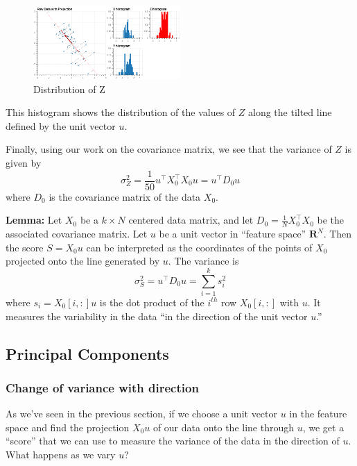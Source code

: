 \documentclass[
]{article}
\begin{document}
\begin{figure}
\hypertarget{fig:pcasimfig-3}{%
\centering
\includegraphics[width=0.5\textwidth,height=\textheight]{../img/PCAsimulated-4.png}
\caption{Distribution of Z}\label{fig:pcasimfig-3}
}
\end{figure}

This histogram shows the distribution of the values of \(Z\) along the
tilted line defined by the unit vector \(u\).

Finally, using our work on the covariance matrix, we see that the
variance of \(Z\) is given by \[
\sigma_{Z}^2 = \frac{1}{50}u^{\intercal}X_{0}^{\intercal}X_{0}u = u^{\intercal}D_{0}u
\] where \(D_{0}\) is the covariance matrix of the data \(X_{0}\).

\textbf{Lemma:} Let \(X_{0}\) be a \(k\times N\) centered data matrix,
and let \(D_{0}=\frac{1}{N}X_{0}^{\intercal}X_{0}\) be the associated
covariance matrix. Let \(u\) be a unit vector in ``feature space''
\(\mathbf{R}^{N}\). Then the score \(S=X_{0}u\) can be interpreted as
the coordinates of the points of \(X_{0}\) projected onto the line
generated by \(u\). The variance is \[
\sigma^{2}_{S} = u^{\intercal}D_{0}u = \sum_{i=1}^{k} s_{i}^2
\] where \(s_{i} = X_{0}[i,:]u\) is the dot product of the \(i^{th}\)
row \(X_{0}[i,:]\) with \(u\). It measures the variability in the data
``in the direction of the unit vector \(u\).''

\hypertarget{principal-components}{%
\subsection{Principal Components}\label{principal-components}}

\hypertarget{change-of-variance-with-direction}{%
\subsubsection{Change of variance with
direction}\label{change-of-variance-with-direction}}

As we've seen in the previous section, if we choose a unit vector \(u\)
in the feature space and find the projection \(X_{0}u\) of our data onto
the line through \(u\), we get a ``score'' that we can use to measure
the variance of the data in the direction of \(u\). What happens as we
vary \(u\)?
\end{document}
